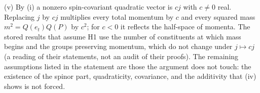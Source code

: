 (v) By (i) a nonzero spin-covariant quadratic vector is $cj$ with $c \ne 0$ real. Replacing $j$ by $cj$ multiplies every total momentum by $c$ and every squared mass $m^{2} = Q(e_{t})Q(P)$ by $c^{2}$; for $c < 0$ it reflects the half-space of momenta. The stored results that assume H1 use the number of constituents at which mass begins and the groups preserving momentum, which do not change under $j \mapsto cj$ (a reading of their statements, not an audit of their proofs). The remaining assumptions listed in the statement are those the argument does not touch: the existence of the spinor part, quadraticity, covariance, and the additivity that (iv) shows is not forced.
